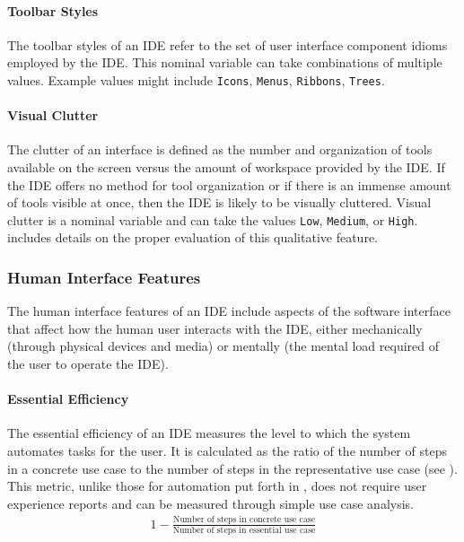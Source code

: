 \paragraph{Toolbar Styles} The toolbar styles of an IDE refer to the set of
user interface component idioms employed by the IDE. \cite{galitz2007} This
nominal variable can take combinations of multiple values. Example values
might include \texttt{Icons}, \texttt{Menus}, \texttt{Ribbons},
\texttt{Trees}.


\paragraph{Visual Clutter} The clutter of an interface is defined as the
number and organization of tools available on the screen versus the amount
of workspace provided by the IDE. If the IDE offers no method for tool
organization or if there is an immense amount of tools visible at once,
then the IDE is likely to be visually cluttered. Visual clutter is a
nominal variable and can take the values \texttt{Low}, \texttt{Medium}, or
\texttt{High}.  includes details on the proper
evaluation of this qualitative feature.


\subsubsection{Human Interface Features} \label{subsubsec:humaninterface}

The human interface features of an IDE include aspects of the software
interface that affect how the human user interacts with the IDE, either
mechanically (\eg through physical devices and media) or mentally (\eg the
mental load required of the user to operate the IDE).


\paragraph{Essential Efficiency} The essential efficiency of an IDE
measures the level to which the system automates tasks for the user. It is
calculated as the ratio of the number of steps in a concrete use case to
the number of steps in the representative use case (see
). This metric, unlike those for automation put forth in
\cite{wei1998}, does not require user experience reports and can be
measured through simple use case analysis.
%
\begin{align}\label{eq:eefficiency}
  1 - \frac{\text{Number of steps in concrete use case}}
            {\text{Number of steps in essential use case}}
\end{align}


